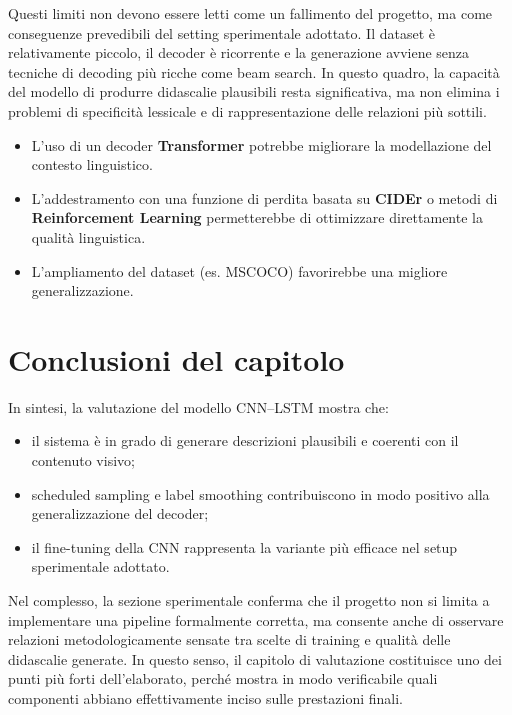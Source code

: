 \documentclass[11pt,a4paper]{report}
\begin{document}
Questi limiti non devono essere letti come un fallimento del progetto, ma come conseguenze prevedibili del setting sperimentale adottato. Il dataset è relativamente piccolo, il decoder è ricorrente e la generazione avviene senza tecniche di decoding più ricche come beam search. In questo quadro, la capacità del modello di produrre didascalie plausibili resta significativa, ma non elimina i problemi di specificità lessicale e di rappresentazione delle relazioni più sottili.

\begin{tcolorbox}[title=Cause e possibili soluzioni]
\begin{itemize}
  \item L’uso di un decoder \textbf{Transformer} potrebbe migliorare la modellazione del contesto linguistico.
  \item L’addestramento con una funzione di perdita basata su \textbf{CIDEr} o metodi di \textbf{Reinforcement Learning} permetterebbe di ottimizzare direttamente la qualità linguistica.
  \item L’ampliamento del dataset (es. MSCOCO) favorirebbe una migliore generalizzazione.
\end{itemize}
\end{tcolorbox}

\section{Conclusioni del capitolo}

In sintesi, la valutazione del modello CNN–LSTM mostra che:
\begin{itemize}
  \item il sistema è in grado di generare descrizioni plausibili e coerenti con il contenuto visivo;
  \item scheduled sampling e label smoothing contribuiscono in modo positivo alla generalizzazione del decoder;
  \item il fine-tuning della CNN rappresenta la variante più efficace nel setup sperimentale adottato.
\end{itemize}

Nel complesso, la sezione sperimentale conferma che il progetto non si limita a implementare una pipeline formalmente corretta, ma consente anche di osservare relazioni metodologicamente sensate tra scelte di training e qualità delle didascalie generate. In questo senso, il capitolo di valutazione costituisce uno dei punti più forti dell’elaborato, perché mostra in modo verificabile quali componenti abbiano effettivamente inciso sulle prestazioni finali.
\end{document}
